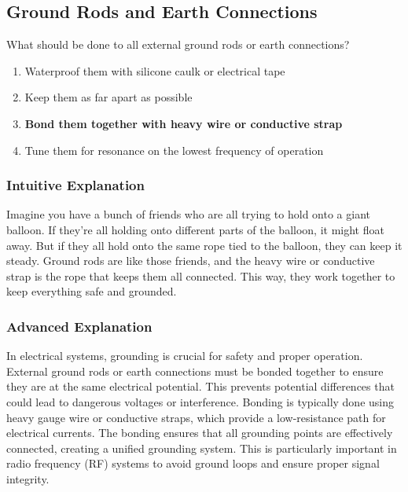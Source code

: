 \subsection{Ground Rods and Earth Connections}
\label{T0A09}

\begin{tcolorbox}[colback=gray!10!white,colframe=black!75!black,title=T0A09]
What should be done to all external ground rods or earth connections?
\begin{enumerate}[label=\Alph*]
    \item Waterproof them with silicone caulk or electrical tape
    \item Keep them as far apart as possible
    \item \textbf{Bond them together with heavy wire or conductive strap}
    \item Tune them for resonance on the lowest frequency of operation
\end{enumerate}
\end{tcolorbox}

\subsubsection{Intuitive Explanation}
Imagine you have a bunch of friends who are all trying to hold onto a giant balloon. If they’re all holding onto different parts of the balloon, it might float away. But if they all hold onto the same rope tied to the balloon, they can keep it steady. Ground rods are like those friends, and the heavy wire or conductive strap is the rope that keeps them all connected. This way, they work together to keep everything safe and grounded.

\subsubsection{Advanced Explanation}
In electrical systems, grounding is crucial for safety and proper operation. External ground rods or earth connections must be bonded together to ensure they are at the same electrical potential. This prevents potential differences that could lead to dangerous voltages or interference. Bonding is typically done using heavy gauge wire or conductive straps, which provide a low-resistance path for electrical currents. The bonding ensures that all grounding points are effectively connected, creating a unified grounding system. This is particularly important in radio frequency (RF) systems to avoid ground loops and ensure proper signal integrity.

